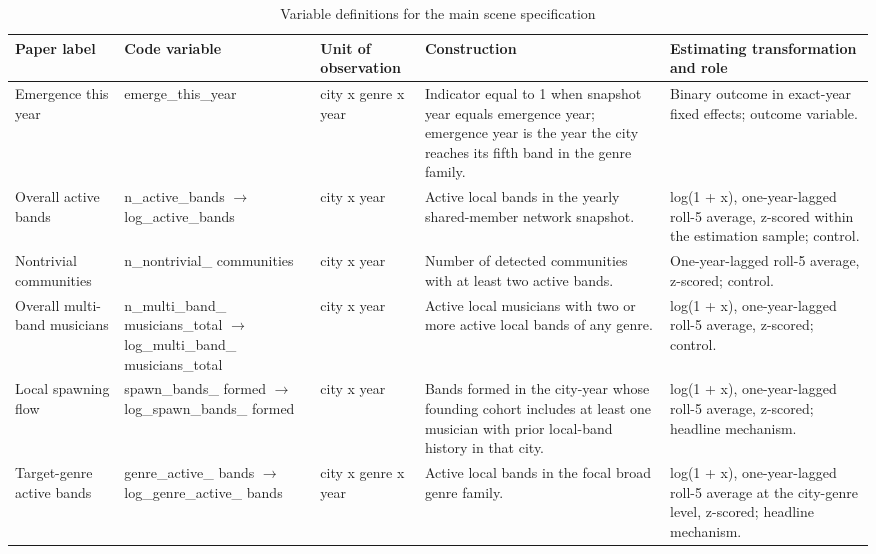 \begin{table}[p]
\centering
\caption{Variable definitions for the main scene specification}
\label{tab:appendix_variable_crosswalk}
\tiny
\setlength{\tabcolsep}{3pt}
\renewcommand{\arraystretch}{1.08}
\begin{tabularx}{\textwidth}{@{}>{\raggedright\arraybackslash}p{}>{\raggedright\arraybackslash}p{}>{\raggedright\arraybackslash}p{}YY@{}}
\toprule
Paper label & Code variable & Unit of observation & Construction & Estimating transformation and role \\
\midrule
Emergence this year & emerge\_this\_year & city x genre x year & Indicator equal to 1 when snapshot year equals emergence year; emergence year is the year the city reaches its fifth band in the genre family. & Binary outcome in exact-year fixed effects; outcome variable. \\
Overall active bands & n\_active\_bands \newline $\rightarrow$ log\_active\_bands & city x year & Active local bands in the yearly shared-member network snapshot. & log(1 + x), one-year-lagged roll-5 average, z-scored within the estimation sample; control. \\
Nontrivial communities & n\_nontrivial\_ \newline communities & city x year & Number of detected communities with at least two active bands. & One-year-lagged roll-5 average, z-scored; control. \\
Overall multi-band musicians & n\_multi\_band\_ \newline musicians\_total \newline $\rightarrow$ log\_multi\_band\_ \newline musicians\_total & city x year & Active local musicians with two or more active local bands of any genre. & log(1 + x), one-year-lagged roll-5 average, z-scored; control. \\
Local spawning flow & spawn\_bands\_ \newline formed \newline $\rightarrow$ log\_spawn\_bands\_ \newline formed & city x year & Bands formed in the city-year whose founding cohort includes at least one musician with prior local-band history in that city. & log(1 + x), one-year-lagged roll-5 average, z-scored; headline mechanism. \\
Target-genre active bands & genre\_active\_ \newline bands \newline $\rightarrow$ log\_genre\_active\_ \newline bands & city x genre x year & Active local bands in the focal broad genre family. & log(1 + x), one-year-lagged roll-5 average at the city-genre level, z-scored; headline mechanism. \\

\end{tabularx}
\end{table}
